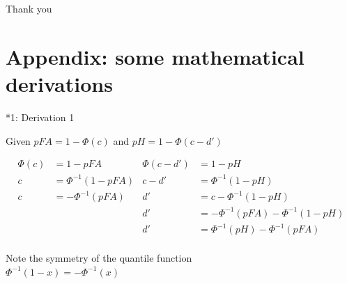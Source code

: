 \documentclass[10pt]{beamer}
\begin{document}
\begin{frame}
\begin{center}
{\Huge Thank you}
\end{center}
\end{frame}

\section{Appendix: some mathematical derivations}
\begin{frame}{*1: Derivation 1}
\begin{center}
Given $pFA = 1 - \Phi(c)$ and $pH = 1 - \Phi(c - d')$

\begin{align*}
\Phi(c) & = 1 - pFA & \Phi(c - d') & = 1 - pH\\
c & = \Phi^{-1}(1 - pFA) & c - d' & = \Phi^{-1}(1 - pH) \\
c & = -\Phi^{-1}(pFA)  &  d' & = c - \Phi^{-1}(1 - pH)  \\
& & d' & = -\Phi^{-1}(pFA)  - \Phi^{-1}(1 - pH) \\
& & d' & = \Phi^{-1}(pH) - \Phi^{-1}(pFA)\\
\end{align*}

Note the symmetry of the quantile function\\
$\Phi^{-1}(1-x) = -\Phi^{-1}(x)$
\end{center}
\end{frame}
\end{document}
